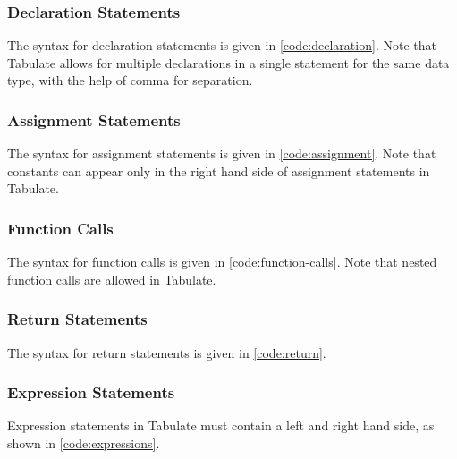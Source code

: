 \documentclass[conference,compsoc]{IEEEtran}
\begin{document}
\subsubsection{Declaration Statements}
The syntax for declaration statements is given in \autoref{code:declaration}.
Note that Tabulate allows for multiple declarations in a single statement for
the same data type, with the help of comma for separation.



\subsubsection{Assignment Statements}
The syntax for assignment statements is given in \autoref{code:assignment}. Note
that constants can appear only in the right hand side of assignment statements
in Tabulate.



\subsubsection{Function Calls}
The syntax for function calls is given in \autoref{code:function-calls}. Note that nested function calls are
allowed in Tabulate.



\subsubsection{Return Statements}
The syntax for return statements is given in \autoref{code:return}.



\subsubsection{Expression Statements}
Expression statements in Tabulate must contain a left and right hand side, as
shown in \autoref{code:expressions}.


\end{document}

